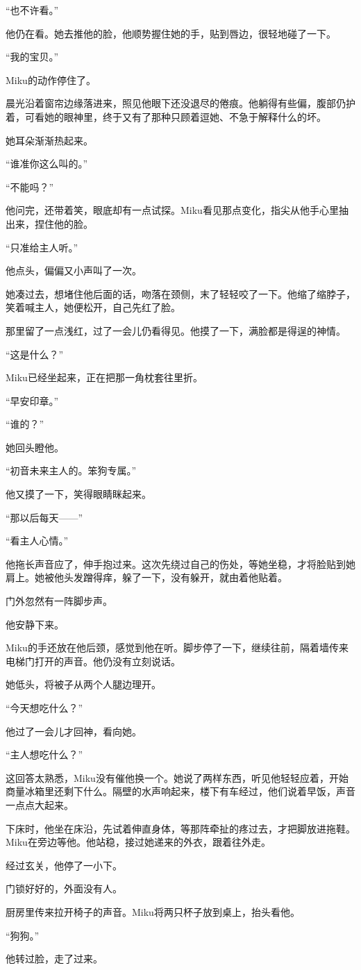 “也不许看。”

他仍在看。她去推他的脸，他顺势握住她的手，贴到唇边，很轻地碰了一下。

“我的宝贝。”

Miku的动作停住了。

晨光沿着窗帘边缘落进来，照见他眼下还没退尽的倦痕。他躺得有些偏，腹部仍护着，可看她的眼神里，终于又有了那种只顾着逗她、不急于解释什么的坏。

她耳朵渐渐热起来。

“谁准你这么叫的。”

“不能吗？”

他问完，还带着笑，眼底却有一点试探。Miku看见那点变化，指尖从他手心里抽出来，捏住他的脸。

“只准给主人听。”

他点头，偏偏又小声叫了一次。

她凑过去，想堵住他后面的话，吻落在颈侧，末了轻轻咬了一下。他缩了缩脖子，笑着喊主人，她便松开，自己先红了脸。

那里留了一点浅红，过了一会儿仍看得见。他摸了一下，满脸都是得逞的神情。

“这是什么？”

Miku已经坐起来，正在把那一角枕套往里折。

“早安印章。”

“谁的？”

她回头瞪他。

“初音未来主人的。笨狗专属。”

他又摸了一下，笑得眼睛眯起来。

“那以后每天——”

“看主人心情。”

他拖长声音应了，伸手抱过来。这次先绕过自己的伤处，等她坐稳，才将脸贴到她肩上。她被他头发蹭得痒，躲了一下，没有躲开，就由着他贴着。

门外忽然有一阵脚步声。

他安静下来。

Miku的手还放在他后颈，感觉到他在听。脚步停了一下，继续往前，隔着墙传来电梯门打开的声音。他仍没有立刻说话。

她低头，将被子从两个人腿边理开。

“今天想吃什么？”

他过了一会儿才回神，看向她。

“主人想吃什么？”

这回答太熟悉，Miku没有催他换一个。她说了两样东西，听见他轻轻应着，开始商量冰箱里还剩下什么。隔壁的水声响起来，楼下有车经过，他们说着早饭，声音一点点大起来。

下床时，他坐在床沿，先试着伸直身体，等那阵牵扯的疼过去，才把脚放进拖鞋。Miku在旁边等他。他站稳，接过她递来的外衣，跟着往外走。

经过玄关，他停了一小下。

门锁好好的，外面没有人。

厨房里传来拉开椅子的声音。Miku将两只杯子放到桌上，抬头看他。

“狗狗。”

他转过脸，走了过来。
